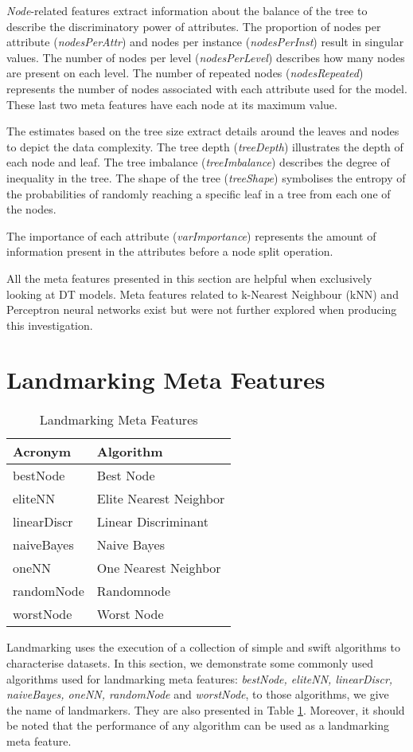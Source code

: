 \textit{Node}-related features extract information about the balance of the tree to describe the discriminatory power of attributes. The proportion of nodes per attribute (\textit{nodesPerAttr}) and nodes per instance (\textit{nodesPerInst}) result in singular values. The number of nodes per level (\textit{nodesPerLevel}) describes how many nodes are present on each level. The number of repeated nodes (\textit{nodesRepeated}) represents the number of nodes associated with each attribute used for the model. These last two meta features have each node at its maximum value.

The estimates based on the tree size extract details around the leaves and nodes to depict the data complexity. The tree depth (\textit{treeDepth}) illustrates the depth of each node and leaf. The tree imbalance (\textit{treeImbalance}) describes the degree of inequality in the tree. The shape of the tree (\textit{treeShape}) symbolises the entropy of the probabilities of randomly reaching a specific leaf in a tree from each one of the nodes.

The importance of each attribute (\textit{varImportance}) represents the amount of information present in the attributes before a node split operation.

All the meta features presented in this section are helpful when exclusively looking at DT models. Meta features related to k-Nearest Neighbour (kNN) and Perceptron neural networks exist but were not further explored when producing this investigation.

\section{Landmarking Meta Features}
\begin{table}[h!]
\centering
\caption{Landmarking Meta Features}
	\setlength{\tabcolsep}{8pt}
	\renewcommand{\arraystretch}{1.2}
    \begin{tabular}{ll}
    \hline
    Acronym & Algorithm \\ \hline
    bestNode & Best Node\\
    eliteNN & Elite Nearest Neighbor\\
    linearDiscr & Linear Discriminant\\
    naiveBayes & Naive Bayes\\
    oneNN & One Nearest Neighbor\\
    randomNode & Randomnode\\
    worstNode & Worst Node\\
    \hline
    \end{tabular}
\label{tab:landmarking-mf}
\end{table}
Landmarking uses the execution of a collection of simple and swift algorithms to characterise datasets. In this section, we demonstrate some commonly used algorithms used for landmarking meta features: \textit{bestNode, eliteNN, linearDiscr, naiveBayes, oneNN, randomNode} and \textit{worstNode}, to those algorithms, we give the name of landmarkers. They are also presented in Table \ref{tab:landmarking-mf}. Moreover, it should be noted that the performance of any algorithm can be used as a landmarking meta feature.

